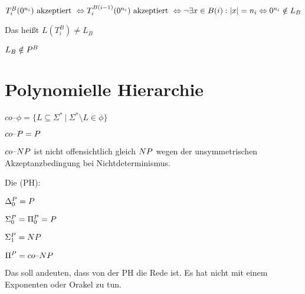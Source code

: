 \begin{beweis}
    $T_i^B(0^{n_i}) \text{ akzeptiert } \\\Leftrightarrow 
    T_i^{B(i-1)}(0^{n_i}) \text{ akzeptiert } \\\Leftrightarrow 
    \neg \exists x \in B(i): |x| = n_i \\\Leftrightarrow 
    0^{n_i} \notin L_B
    $

    Das heißt $L(T_i^B) \neq L_B$

    $L_B \notin P^B$

\end{beweis}





\section{Polynomielle Hierarchie}

\begin{definition}
    
    $co\text{--}\phi = \{ L \subseteq \Sigma^\ast \ |\ \Sigma^\ast \setminus L \in \phi  \}$

\end{definition}

$co\text{--}P = P$

$co\text{--}NP$ ist nicht offensichtlich gleich $NP$ wegen der unsymmetrischen Akzeptanzbedingung bei Nichtdeterminismus.


\begin{definition}
    
    Die  (PH):

    $\Delta_0^{P} = P$

    $\Sigma_0^{P} = \Pi_0^{P} = P$


    
    $\Sigma_1^{P} = NP$

    $\Pi^{P} = co\text{--}NP$

    Das soll andeuten, dass von der PH die Rede ist. Es hat nicht mit einem Exponenten oder Orakel zu tun.

\end{definition}


    


